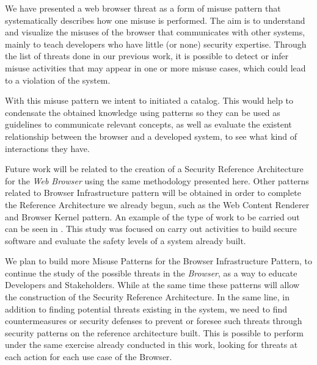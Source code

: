 \documentclass{sig-alternate-05-2015}
\begin{document}


We have presented a web browser threat as a form of misuse pattern that systematically describes how one misuse is performed. The aim is to understand and visualize the misuses of the browser that communicates with other systems, mainly to teach developers who have little (or none) security expertise. Through the list of threats done in our previous work, it is possible to detect or infer misuse activities that may appear in one or more misuse cases, which could lead to a violation of the system.

With this misuse pattern we intent to initiated a catalog. This would help to condensate the obtained knowledge using patterns so they can be used as guidelines to communicate relevant concepts, as well as evaluate the existent relationship between the browser and a developed system, to see what kind of interactions they have.

Future work will be related to the creation of a Security Reference Architecture for the \textit{Web Browser} using the same methodology presented here. Other patterns related to Browser Infrastructure pattern will be obtained in order to complete the Reference Architecture we already begun, such as the Web Content Renderer and Browser Kernel pattern. An example of the type of work to be carried out can be seen in \cite{Fernandez2015}. This study was focused on carry out activities to build secure software and evaluate the safety levels of a system already built.

We plan to build more Misuse Patterns for the Browser Infrastructure Pattern, to continue the study of the possible threats in the \textit{Browser}, as a way to educate Developers and Stakeholders. While at the same time these patterns will allow the construction of the Security Reference Architecture. In the same line, in addition to finding potential threats existing in the system, we need to find countermeasures or security defenses to prevent or foresee such threats through security patterns on the reference architecture built. This is possible to perform under the same exercise already conducted in this work, looking for threats at each action for each use case of the Browser.

  

\end{document}
